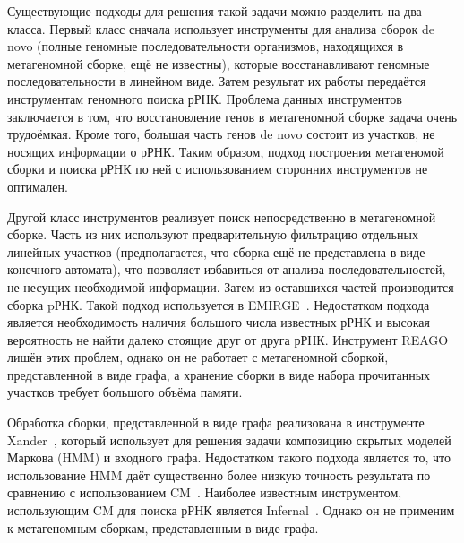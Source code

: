 Существующие подходы для решения такой задачи можно разделить на два класса. Первый класс сначала использует инструменты для анализа сборок de novo (полные геномные последовательности организмов, находящихся в метагеномной сборке, ещё не известны), которые восстанавливают геномные последовательности в линейном виде. Затем результат их работы передаётся инструментам геномного поиска рРНК. Проблема данных инструментов заключается в том, что восстановление генов в метагеномной сборке задача очень трудоёмкая. Кроме того, большая часть генов de novo состоит из участков, не носящих информации о рРНК. Таким образом, подход построения метагеномой сборки и поиска рРНК по ней с использованием сторонних инструментов не оптимален. 

Другой класс инструментов реализует поиск непосредственно в метагеномной сборке. Часть из них используют предварительную фильтрацию отдельных линейных участков (предполагается, что сборка ещё не представлена в виде конечного автомата), что позволяет избавиться от анализа последовательностей, не несущих необходимой информации. Затем из оставшихся частей производится сборка pРНК. Такой подход используется в EMIRGE~\cite{Emirge}. Недостатком подхода является необходимость наличия большого числа известных рРНК и высокая вероятность не найти далеко стоящие друг от друга рРНК. Инструмент REAGO лишён этих проблем, однако он не работает с метагеномной сборкой, представленной в виде графа, а хранение сборки в виде набора прочитанных участков требует большого объёма памяти.

Обработка сборки, представленной в виде графа реализована в инструменте Xander~\cite{Wang2015}, который использует для решения задачи композицию скрытых моделей Маркова (HMM) и входного графа. Недостатком такого подхода является то, что использование HMM даёт существенно более низкую точность результата по сравнению с использованием CM~\cite{EddyComputationalRNA}. Наиболее известным инструментом, использующим CM для поиска рРНК является Infernal~\cite{Infernal}. Однако он не применим к метагеномным сборкам, представленным в виде графа.

